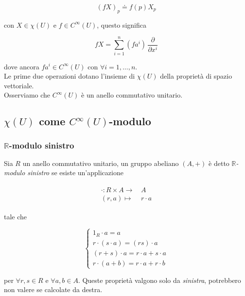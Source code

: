 \begin{equation}
	(f X)_{p} \doteq f(p) X_{p}
\end{equation}

con $ X \in \chi(U) $ e $ f \in C^{\infty}(U) $, questo significa

\begin{equation}
	f X = \sum_{i=1}^{n} (f a^{i}) \, \dfrac{\partial}{\partial x^{i}}
\end{equation}

dove ancora $ f a^{i} \in C^{\infty}(U) $ con $ \forall i=1,\dots,n $.\\
Le prime due operazioni dotano l'insieme di $ \chi(U) $ della proprietà di spazio vettoriale.\\
Osserviamo che $ C^{\infty}(U) $ è un anello commutativo unitario.

\subsection{$ \chi(U) $ come $ C^{\infty}(U) $-modulo}

\subsubsection{$ \mathbb{R} $-modulo sinistro}

Sia $ R $ un anello commutativo unitario, un gruppo abeliano $ (A,+) $ è detto $ \mathbb{R} $\textit{-modulo sinistro} se esiste un'applicazione

\begin{align}
	\begin{split}
		\cdot : R \times A \to& \, A\\
		(r,a) \mapsto& \, r \cdot a
	\end{split}
\end{align}

tale che

\begin{equation}
	\begin{cases}
		1_{R} \cdot a = a\\
		r \cdot (s \cdot a) = (r s) \cdot a\\
		(r+s) \cdot a = r \cdot a + s \cdot a\\
		r \cdot (a+b) = r \cdot a + r \cdot b
	\end{cases}
\end{equation}

per $ \forall r,s \in R $ e $ \forall a,b \in A $. Queste proprietà valgono solo da \textit{sinistra}, potrebbero non valere se calcolate da destra.

